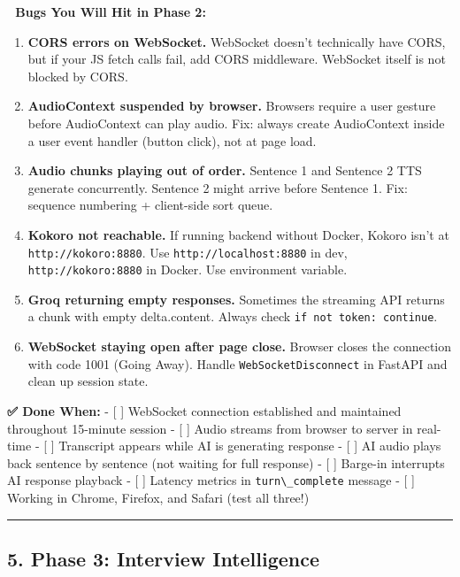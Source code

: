 \documentclass[
  11pt,
]{article}
\newcommand{\passthrough}[1]{#1}
\begin{document}
\textbf{🐛 Bugs You Will Hit in Phase 2:}

\begin{enumerate}
\def\labelenumi{\arabic{enumi}.}
\item
  \textbf{CORS errors on WebSocket.} WebSocket doesn't technically have
  CORS, but if your JS fetch calls fail, add CORS middleware. WebSocket
  itself is not blocked by CORS.
\item
  \textbf{AudioContext suspended by browser.} Browsers require a user
  gesture before AudioContext can play audio. Fix: always create
  AudioContext inside a user event handler (button click), not at page
  load.
\item
  \textbf{Audio chunks playing out of order.} Sentence 1 and Sentence 2
  TTS generate concurrently. Sentence 2 might arrive before Sentence 1.
  Fix: sequence numbering + client-side sort queue.
\item
  \textbf{Kokoro not reachable.} If running backend without Docker,
  Kokoro isn't at \passthrough{\lstinline!http://kokoro:8880!}. Use
  \passthrough{\lstinline!http://localhost:8880!} in dev,
  \passthrough{\lstinline!http://kokoro:8880!} in Docker. Use
  environment variable.
\item
  \textbf{Groq returning empty responses.} Sometimes the streaming API
  returns a chunk with empty delta.content. Always check
  \passthrough{\lstinline!if not token: continue!}.
\item
  \textbf{WebSocket staying open after page close.} Browser closes the
  connection with code 1001 (Going Away). Handle
  \passthrough{\lstinline!WebSocketDisconnect!} in FastAPI and clean up
  session state.
\end{enumerate}

\textbf{✅ Done When:} - {[} {]} WebSocket connection established and
maintained throughout 15-minute session - {[} {]} Audio streams from
browser to server in real-time - {[} {]} Transcript appears while AI is
generating response - {[} {]} AI audio plays back sentence by sentence
(not waiting for full response) - {[} {]} Barge-in interrupts AI
response playback - {[} {]} Latency metrics in
\passthrough{\lstinline!turn\_complete!} message - {[} {]} Working in
Chrome, Firefox, and Safari (test all three!)

\begin{center}\rule{0.5\linewidth}{0.5pt}\end{center}

\hypertarget{phase-3-interview-intelligence}{%
\subsection{5. Phase 3: Interview
Intelligence}\label{phase-3-interview-intelligence}}
\end{document}
